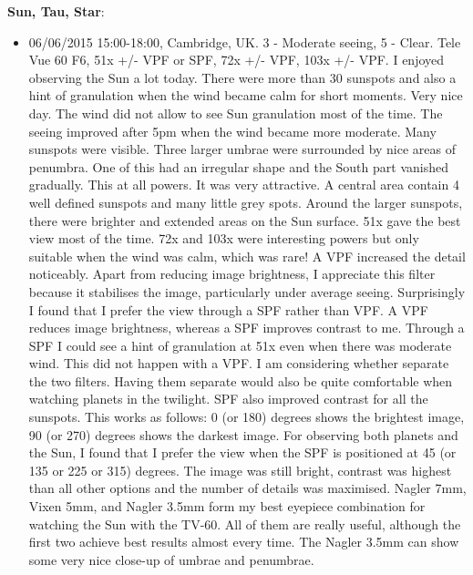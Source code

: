 {\bf Sun, Tau, Star}:
\begin{itemize}
\item 06/06/2015 15:00-18:00, Cambridge, UK. 3 - Moderate seeing, 5 - Clear. Tele Vue 60 F6, 51x +/- VPF or SPF, 72x +/- VPF, 103x +/- VPF. I enjoyed observing the Sun a lot today. There were more than 30 sunspots and also a hint of granulation when the wind became calm for short moments. Very nice day. The wind did not allow to see Sun granulation most of the time. The seeing improved after 5pm when the wind became more moderate. Many sunspots were visible. Three larger umbrae were surrounded by nice areas of penumbra. One of this had an irregular shape and the South part vanished gradually. This at all powers. It was very attractive. A central area contain 4 well defined sunspots and many little grey spots. Around the larger sunspots, there were brighter and extended areas on the Sun surface. 51x gave the best view most of the time. 72x and 103x were interesting powers but only suitable when the wind was calm, which was rare! A VPF increased the detail noticeably. Apart from reducing image brightness, I appreciate this filter because it stabilises the image, particularly under average seeing. Surprisingly I found that I prefer the view through a SPF rather than VPF. A VPF reduces image brightness, whereas a SPF improves contrast to me. Through a SPF I could see a hint of granulation at 51x even when there was moderate wind. This did not happen with a VPF. I am considering whether separate the two filters. Having them separate would also be quite comfortable when watching planets in the twilight. SPF also improved contrast for all the sunspots. This works as follows: 0 (or 180) degrees shows the brightest image, 90 (or 270) degrees shows the darkest image. For observing both planets and the Sun, I found that I prefer the view when the SPF is positioned at 45 (or 135 or 225 or 315) degrees. The image was still bright, contrast was highest than all other options and the number of details was maximised. Nagler 7mm, Vixen 5mm, and Nagler 3.5mm form my best eyepiece combination for watching the Sun with the TV-60. All of them are really useful, although the first two achieve best results almost every time. The Nagler 3.5mm can show some very nice close-up of umbrae and penumbrae.
\end{itemize}
